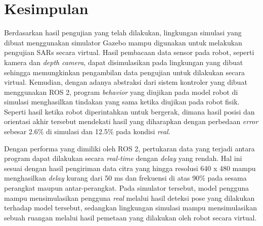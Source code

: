 \section{Kesimpulan}
\label{sec:kesimpulan}

Berdasarkan hasil pengujian yang telah dilakukan,
  lingkungan simulasi yang dibuat menggunakan simulator Gazebo mampu digunakan untuk melakukan pengujian SARs secara virtual.
Hasil pembacaan data sensor pada robot, seperti kamera dan \emph{depth camera},
  dapat disimulasikan pada lingkungan yang dibuat sehingga memungkinkan pengambilan data pengujian untuk dilakukan secara virtual.
Kemudian, dengan adanya abstraksi dari sistem kontroler yang dibuat menggunakan ROS 2,
  program \emph{behavior} yang diujikan pada model robot di simulasi menghasilkan tindakan yang sama ketika diujikan pada robot fisik.
Seperti hasil ketika robot diperintahkan untuk bergerak,
  dimana hasil posisi dan orientasi akhir tersebut mendekati hasil yang diharapkan dengan perbedaan \emph{error} sebesar 2.6\% di simulasi dan 12.5\% pada kondisi \emph{real}.

Dengan performa yang dimiliki oleh ROS 2,
  pertukaran data yang terjadi antara program dapat dilakukan secara \emph{real-time} dengan \emph{delay} yang rendah.
Hal ini sesuai dengan hasil pengiriman data citra yang hingga resolusi 640 x 480 mampu menghasilkan \emph{delay} kurang dari 50 ms dan frekuensi di atas 90\% pada sesama perangkat maupun antar-perangkat.
Pada simulator tersebut,
  model pengguna mampu mensimulasikan pengguna \emph{real} melalui hasil deteksi pose yang dilakukan terhadap model tersebut,
  sedangkan lingkungan simulasi mampu mensimulasikan sebuah ruangan melalui hasil pemetaan yang dilakukan oleh robot secara virtual.
